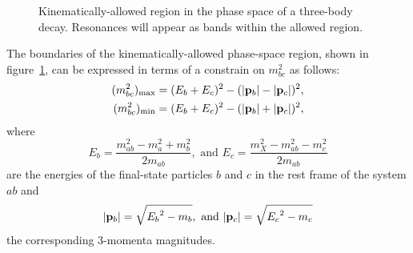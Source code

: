     \begin{figure}
        \centering
        
        \caption{Kinematically-allowed region in the phase space of a three-body decay. Resonances will appear as bands within the allowed region.}
        \label{fig:dalitz_kinematically_allowed}
    \end{figure}
    The boundaries of the kinematically-allowed phase-space region, shown in figure~\ref{fig:dalitz_kinematically_allowed}, can be expressed in terms of a constrain on $m_{bc}^2$ as follows:
    \begin{equation}
        \begin{aligned}
            (m_{bc}^2)_{\text{max}} &= (E_b + E_c)^2 - (\lvert\mathbf{{p}}_b\rvert - \lvert\mathbf{{p}}_c\rvert)^2,\\
            (m_{bc}^2)_{\text{min}} &= (E_b + E_c)^2 - (\lvert\mathbf{{p}}_b\rvert + \lvert\mathbf{{p}}_c\rvert)^2,
        \end{aligned}
    \end{equation}
    where
    \begin{equation}
        E_b = \frac{m_{ab}^2 - m_a^2 + m_b^2}{2m_{ab}},\text{ and }
        E_c = \frac{m_X^2 - m_{ab}^2 - m_c^2}{2 m_{ab}}
    \end{equation}
    are the energies of the final-state particles $b$ and $c$ in the rest frame of the system $ab$ and
    \begin{equation}
        \lvert\mathbf{{p}}_b\rvert = \sqrt{{E_b}^2 - m_b},\text{ and }
        \lvert\mathbf{{p}}_c\rvert = \sqrt{{E_c}^2 - m_c}
    \end{equation}
    the corresponding 3-momenta magnitudes.
